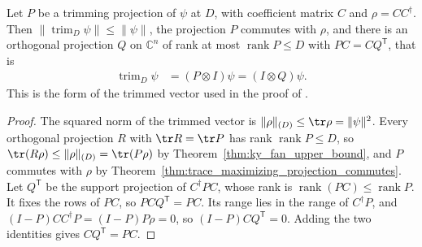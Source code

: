 \begin{theorem}
    \label{thm:trimming_second_factor}
    \leanok
    Let $P$ be a trimming projection of $\psi$ at $D$, with coefficient
    matrix $C$ and $\rho=CC^\dagger$. Then
    $\|\operatorname{trim}_D\psi\|\le\|\psi\|$, the projection $P$ commutes
    with $\rho$, and there is an orthogonal projection $Q$ on
    $\mathbb C^n$ of rank at most $\operatorname{rank}P\le D$ with
    $PC=CQ^{\mathsf T}$, that is
    \begin{align}
        \operatorname{trim}_D\psi & =(P\otimes I)\psi=(I\otimes Q)\psi.
        \label{eq:trimming_second_factor}
    \end{align}
    This is the form of the trimmed vector used in the proof of
    \cite[Lemma~l:trim2]{Landau2013PolynomialTime}.
\end{theorem}

\begin{proof}
    \leanok
    The squared norm of the trimmed vector is $\|\rho\|_{(D)}\le\tr\rho
        =\|\psi\|^2$. Every orthogonal projection $R$ with $\tr R=\tr P$ has
    rank $\operatorname{rank}P\le D$, so
    $\tr(R\rho)\le\|\rho\|_{(D)}=\tr(P\rho)$ by
    Theorem~\ref{thm:ky_fan_upper_bound}, and $P$ commutes with $\rho$ by
    Theorem~\ref{thm:trace_maximizing_projection_commutes}. Let
    $Q^{\mathsf T}$ be the support projection of $C^\dagger PC$, whose rank
    is $\operatorname{rank}(PC)\le\operatorname{rank}P$. It fixes the rows
    of $PC$, so $PCQ^{\mathsf T}=PC$. Its range lies in the range of
    $C^\dagger P$, and $(I-P)CC^\dagger P=(I-P)P\rho=0$, so
    $(I-P)CQ^{\mathsf T}=0$. Adding the two identities gives
    $CQ^{\mathsf T}=PC$.
\end{proof}

